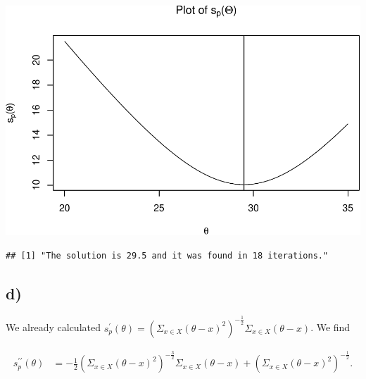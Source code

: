 \documentclass[]{article}
\newenvironment{Shaded}{\begin{snugshade}}{\end{snugshade}}
\newcommand{\KeywordTok}[1]{\textcolor[rgb]{0.13,0.29,0.53}{\textbf{#1}}}
\newcommand{\DataTypeTok}[1]{\textcolor[rgb]{0.13,0.29,0.53}{#1}}
\newcommand{\DecValTok}[1]{\textcolor[rgb]{0.00,0.00,0.81}{#1}}
\newcommand{\CharTok}[1]{\textcolor[rgb]{0.31,0.60,0.02}{#1}}
\newcommand{\StringTok}[1]{\textcolor[rgb]{0.31,0.60,0.02}{#1}}
\newcommand{\NormalTok}[1]{#1}
\begin{document}
\begin{Shaded}
\end{Shaded}

\includegraphics{Atlas-PS_2_files/figure-latex/unnamed-chunk-2-1.pdf}

\begin{verbatim}
## [1] "The solution is 29.5 and it was found in 18 iterations."
\end{verbatim}

\subsection{d)}\label{d}

We already calculated
\(s_p^\prime (\theta) = (\Sigma_{x \in X} (\theta - x)^{2})^{-\frac{1}{2}}\Sigma_{x\in X}(\theta - x)\).
We find

\begin{align*}
s_p^{\prime \prime} (\theta) &= -\frac{1}{2} (\Sigma_{x \in X} (\theta - x)^2)^{-\frac{3}{2}}
\Sigma_{x \in X}(\theta - x) +  (\Sigma_{x \in X} (\theta - x)^2)^{-\frac{1}{2}}.
\end{align*}
\end{document}
